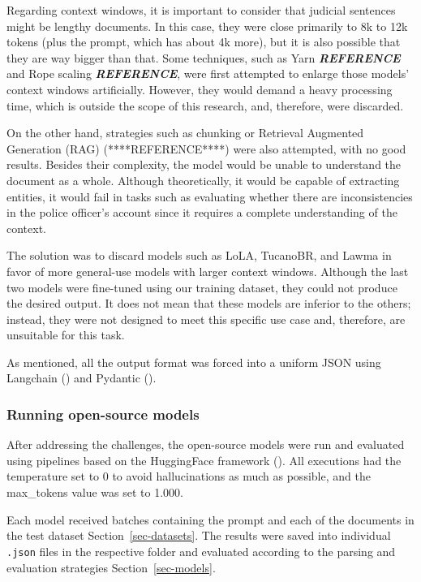 \documentclass[
  12pt,
]{article}
\begin{document}
Regarding context windows, it is important to consider that judicial
sentences might be lengthy documents. In this case, they were close
primarily to 8k to 12k tokens (plus the prompt, which has about 4k
more), but it is also possible that they are way bigger than that. Some
techniques, such as Yarn \textbf{\emph{REFERENCE}} and Rope scaling
\textbf{\emph{REFERENCE}}, were first attempted to enlarge those models'
context windows artificially. However, they would demand a heavy
processing time, which is outside the scope of this research, and,
therefore, were discarded.

On the other hand, strategies such as chunking or Retrieval Augmented
Generation (RAG) (****REFERENCE****) were also attempted, with no good
results. Besides their complexity, the model would be unable to
understand the document as a whole. Although theoretically, it would be
capable of extracting entities, it would fail in tasks such as
evaluating whether there are inconsistencies in the police officer's
account since it requires a complete understanding of the context.

The solution was to discard models such as LoLA, TucanoBR, and Lawma in
favor of more general-use models with larger context windows. Although
the last two models were fine-tuned using our training dataset, they
could not produce the desired output. It does not mean that these models
are inferior to the others; instead, they were not designed to meet this
specific use case and, therefore, are unsuitable for this task.

As mentioned, all the output format was forced into a uniform JSON using
Langchain () and
Pydantic ().

\subsubsection{Running open-source
models}\label{running-open-source-models}

After addressing the challenges, the open-source models were run and
evaluated using pipelines based on the HuggingFace framework
(). All
executions had the temperature set to 0 to avoid hallucinations as much
as possible, and the max\_tokens value was set to 1.000.

Each model received batches containing the prompt and each of the
documents in the test dataset Section~\ref{sec-datasets}. The results
were saved into individual \texttt{.json} files in the respective folder
and evaluated according to the parsing and evaluation strategies
Section~\ref{sec-models}.
\end{document}

